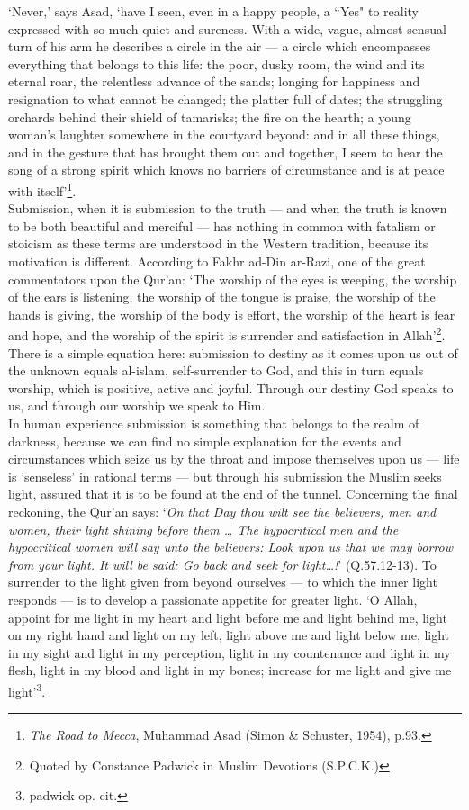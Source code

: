 \documentclass[10pt, twoside]{book}
\begin{document}
`Never,' says Asad, `have I seen, even in a happy people, a ``Yes" to reality expressed with so much 
quiet and sureness. With a wide, vague, almost sensual turn of his arm he describes a circle in the 
air --- a circle which encompasses everything that belongs to this life: the poor, dusky room, the wind 
and its eternal roar, the relentless advance of the sands; longing for happiness and resignation to 
what cannot be changed; the platter full of dates; the struggling orchards behind their shield of 
tamarisks; the fire on the hearth; a young woman's laughter somewhere in the courtyard beyond: and in 
all these things, and in the gesture that has brought them out and together, I seem to hear the song 
of a strong spirit which knows no barriers of circumstance and is at peace with itself'\footnote{\emph{The Road to Mecca}, Muhammad Asad (Simon \& Schuster, 1954), p.93.}. \\

Submission, when it is submission to the truth --- and when the truth is known to be both beautiful and 
merciful --- has nothing in common with fatalism or stoicism as these terms are understood in the 
Western tradition, because its motivation is different. According to Fakhr ad\hyp{}Din ar\hyp{}Razi, one of the great commentators upon the Qur'an: `The worship of the eyes is weeping, the worship of the ears is 
listening, the worship of the tongue is praise, the worship of the hands is giving, the worship of 
the body is effort, the worship of the heart is fear and hope, and the worship of the spirit is 
surrender and satisfaction in Allah'\footnote{Quoted by Constance Padwick in Muslim Devotions (S.P.C.K.)}. There is a simple equation here: submission to destiny as it comes upon us out of the unknown equals al\hyp{}islam, self\hyp{}surrender to God, and this in turn equals worship, which is positive, active and joyful. Through our destiny God speaks to us, and through our worship we speak to Him. \\

In human experience submission is something that belongs to the realm of darkness, because we can 
find no simple explanation for the events and circumstances which seize us by the throat and impose 
themselves upon us --- life is 'senseless' in rational terms --- but through his submission the Muslim 
seeks light, assured that it is to be found at the end of the tunnel. Concerning the final reckoning, 
the Qur'an says: `\emph{On that Day thou wilt see the believers, men and women, their light shining before them \ldots{} The hypocritical men and the hypocritical women will say unto the believers: Look upon us that we may borrow from your light. It will be said: Go back and seek for light\ldots{}!}' (Q.57.12-13). To surrender to the light given from beyond ourselves --- to which the inner light responds --- is to develop a passionate appetite for greater light. `O Allah, appoint for me light in my heart and light before me and light behind me, light on my right hand and light on my left, light above me and light below me, light in my sight and light in my perception, light in my countenance and light in my flesh, light in my blood and light in my bones; increase for me light and give me light'\footnote{padwick op. cit.}.\\
\end{document}
